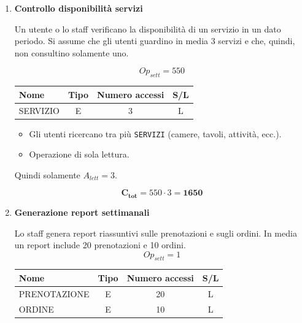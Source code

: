 \documentclass[a4paper,12pt]{report}
\begin{document}
\begin{enumerate}
	\item {\large \textbf{Controllo disponibilità servizi}} \label{op6}

	      Un utente o lo staff verificano la disponibilità di un servizio in un dato periodo.
	      Si assume che gli utenti guardino in media 3 servizi e che, quindi, non consultino solamente uno.

	      $$
		      Op_{sett} = 550
	      $$

	      \begin{table}[H]
		      \centering
		      \small
		      \renewcommand{\arraystretch}{1.15}
		      \begin{tabularx}{0.8\textwidth}{|X|c|c|c|}
			      \hline
			      \rowcolor{gray!20}
			      \textbf{Nome} & \textbf{Tipo} & \textbf{Numero accessi} & \textbf{S/L} \\
			      \hline
			      SERVIZIO      & E             & 3                       & L            \\
			      \hline
		      \end{tabularx}
	      \end{table}

	      \begin{itemize}
		      \item Gli utenti ricercano tra più \texttt{SERVIZI} (camere, tavoli, attività, ecc.).
		      \item Operazione di sola lettura.
	      \end{itemize}

	      Quindi solamente $A_{lett}=3$.

	      $$\mathbf{C_{tot}} = 550 \cdot 3 = \mathbf{1650}$$

	\item {\large \textbf{Generazione report settimanali}} \label{op7}

	      Lo staff genera report riassuntivi sulle prenotazioni e sugli ordini.
	      In media un report include 20 prenotazioni e 10 ordini.
	      $$
		      Op_{sett} = 1
	      $$

	      \begin{table}[H]
		      \centering
		      \small
		      \renewcommand{\arraystretch}{1.15}
		      \begin{tabularx}{0.8\textwidth}{|X|c|c|c|}
			      \hline
			      \rowcolor{gray!20}
			      \textbf{Nome} & \textbf{Tipo} & \textbf{Numero accessi} & \textbf{S/L} \\
			      \hline
			      PRENOTAZIONE  & E             & 20                      & L            \\
			      ORDINE        & E             & 10                      & L            \\
			      \hline
		      \end{tabularx}
	      \end{table}


\end{enumerate}
\end{document}
